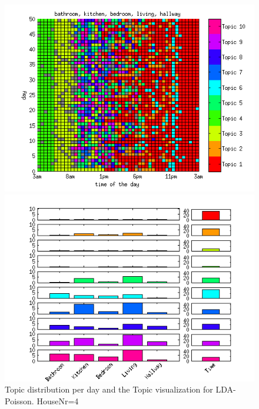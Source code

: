 \begin{figure}
 \centering
 \begin{minipage}[b]{0.45\linewidth}
  \centering
  \includegraphics[width=\textwidth]{Pictures/Pois/DayHN4TS48k20.png}
 \end{minipage}
 \begin{minipage}[b]{0.45\linewidth}
  \centering
  \includegraphics[width=\textwidth]{Pictures/Pois/TopHN4TS48k20.png}
 \end{minipage}
 \caption{Topic distribution per day and the Topic visualization for LDA-Poisson. HouseNr=4}
\end{figure}


